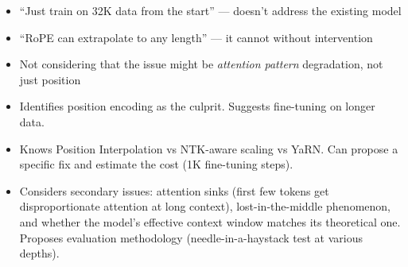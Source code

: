 \begin{interviewq}
\redflags
\begin{itemize}
    \item ``Just train on 32K data from the start'' --- doesn't address the existing model
    \item ``RoPE can extrapolate to any length'' --- it cannot without intervention
    \item Not considering that the issue might be \textit{attention pattern} degradation, not just position
\end{itemize}


\goodgreat
\begin{itemize}
    \item {} Identifies position encoding as the culprit. Suggests fine-tuning on longer data.
    \item {} Knows Position Interpolation vs NTK-aware scaling vs YaRN. Can propose a specific fix and estimate the cost (1K fine-tuning steps).
    \item {} Considers secondary issues: attention sinks (first few tokens get disproportionate attention at long context), lost-in-the-middle phenomenon, and whether the model's effective context window matches its theoretical one. Proposes evaluation methodology (needle-in-a-haystack test at various depths).
\end{itemize}

\end{interviewq}

